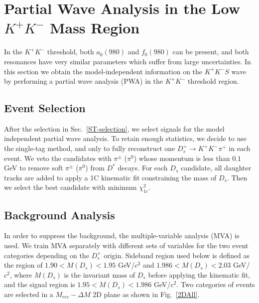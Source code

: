 \section{Partial Wave Analysis in the Low $K^{+}K^{-}$ Mass Region}
\label{MIPWA}
\par{In the $K^{+}K^{-}$ threshold, both $a_{0}(980)$ and $f_{0}(980)$ can be present, and both resonances have very similar parameters which suffer from large uncertainties. 
In this section we obtain the model-independent information on the $K^{+}K^{-} S$ wave by performing a partial wave analysis (PWA) in the  $K^{+}K^{-}$ threshold region.}
\subsection{Event Selection}
\label{MIPWASelection}
\par{
    After the selection in Sec.~\ref{ST-selection}, we select signals for the model independent partial wave analysis.
    To retain enough statistics, we decide to use the single-tag method, and only to fully reconstruct one $D_{s}^{+} \rightarrow K^{+}K^{-}\pi^{+}$ in each event. 
We veto the candidates with $\pi^{\pm}$ ($\pi^{0}$) whose momentum is less than $0.1$ GeV to remove soft $\pi^{\pm}$ ($\pi^{0}$) from $D^{*}$ decays.
For each $D_{s}$ candidate, all daughter tracks are added to apply a 1C kinematic fit constraining the mass of $D_{s}$. 
Then we select the best candidate with minimum $\chi_{1c}^{2}$.
}
\subsection{Background Analysis}
\label{MIPWA-BA}
In order to suppress the background, the multiple-variable analysis (MVA) is used. We train MVA separately with different sets of variables for the two event categories depending on the $D_{s}^{+}$ origin. 
Sideband region used below is defined as the region of  $1.90 < M(D_{s}) < 1.95$ GeV/$c^{2}$ and   $1.986 < M(D_{s}) < 2.03$ GeV/$c^{2}$, where $M(D_{s})$ is the invariant mass of $D_{s}$ before applying the kinematic fit, and the signal region is $1.95 < M(D_{s}) < 1.986$ GeV/$c^{2}$.
Two categories of events are selected in a $M_{rec}-\Delta{M}$ 2D plane as shown in Fig.~\ref{2DAll}.




